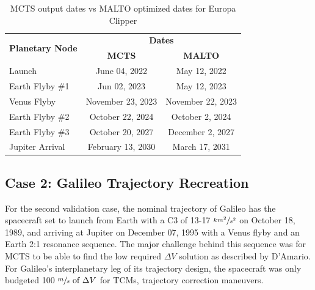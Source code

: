 \documentclass[letterpaper, preprint, paper,11pt]{AAS}	%
\begin{document}
\begin{table}[htb]
    \begin{center}
        \caption{MCTS output dates vs MALTO optimized dates for Europa Clipper}
        \label{table:clipMInputs}
        \begin{tabular}{lcc}
            \toprule
            \multirow{2}{*}{\textbf{Planetary Node}} & \multicolumn{2}{c}{\textbf{Dates}}\\
            \cmidrule{2-3}
            {} & \textbf{MCTS} & \textbf{MALTO}\\
            \midrule
            Launch & June 04, 2022 & May 12, 2022 \\
            Earth Flyby \#1 & Jun 02, 2023 & May 12, 2023 \\
            Venus Flyby & November 23, 2023 & November 22, 2023 \\ 
            Earth Flyby \#2 & October 22, 2024 & October 2, 2024 \\
            Earth Flyby \#3 & October 20, 2027 & December 2, 2027 \\
            Jupiter Arrival & February 13, 2030 & March 17, 2031 \\
            \bottomrule
        \end{tabular}
    \end{center}
\end{table}

\subsection{Case 2: Galileo Trajectory Recreation}

For the second validation case, the nominal trajectory of Galileo has the spacecraft set to launch from Earth with a C3 of 13-17 $\sfrac{km^2}{s^2}$ on October 18, 1989, and arriving at Jupiter on December 07, 1995 with a Venus flyby and an Earth 2:1 resonance sequence. The major challenge behind this sequence was for MCTS to be able to find the low required $\Delta V$ solution as described by D'Amario\cite{DAmario1992}. For Galileo's interplanetary leg of its trajectory design, the spacecraft was only budgeted 100 $\sfrac{m}{s} \text{ of } \Delta V$ for TCMs, trajectory correction maneuvers. 
\end{document}
